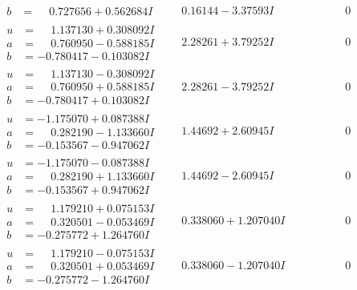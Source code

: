\documentclass[1p]{elsarticle_modified}
\theoremstyle{definition}
\begin{document}
$$\begin{array}{c|c|c}
\begin{aligned}
b &= \phantom{-}0.727656 + 0.562684 I\end{aligned}
 & \phantom{-}0.16144 - 3.37593 I & \phantom{-0.000000 } 0 \\ \hline\begin{aligned}
u &= \phantom{-}1.137130 + 0.308092 I \\
a &= \phantom{-}0.760950 - 0.588185 I \\
b &= -0.780417 - 0.103082 I\end{aligned}
 & \phantom{-}2.28261 + 3.79252 I & \phantom{-0.000000 } 0 \\ \hline\begin{aligned}
u &= \phantom{-}1.137130 - 0.308092 I \\
a &= \phantom{-}0.760950 + 0.588185 I \\
b &= -0.780417 + 0.103082 I\end{aligned}
 & \phantom{-}2.28261 - 3.79252 I & \phantom{-0.000000 } 0 \\ \hline\begin{aligned}
u &= -1.175070 + 0.087388 I \\
a &= \phantom{-}0.282190 - 1.133660 I \\
b &= -0.153567 - 0.947062 I\end{aligned}
 & \phantom{-}1.44692 + 2.60945 I & \phantom{-0.000000 } 0 \\ \hline\begin{aligned}
u &= -1.175070 - 0.087388 I \\
a &= \phantom{-}0.282190 + 1.133660 I \\
b &= -0.153567 + 0.947062 I\end{aligned}
 & \phantom{-}1.44692 - 2.60945 I & \phantom{-0.000000 } 0 \\ \hline\begin{aligned}
u &= \phantom{-}1.179210 + 0.075153 I \\
a &= \phantom{-}0.320501 - 0.053469 I \\
b &= -0.275772 + 1.264760 I\end{aligned}
 & \phantom{-}0.338060 + 1.207040 I & \phantom{-0.000000 } 0 \\ \hline\begin{aligned}
u &= \phantom{-}1.179210 - 0.075153 I \\
a &= \phantom{-}0.320501 + 0.053469 I \\
b &= -0.275772 - 1.264760 I\end{aligned}
 & \phantom{-}0.338060 - 1.207040 I & \phantom{-0.000000 } 0\\

\end{array}$$
\end{document}
